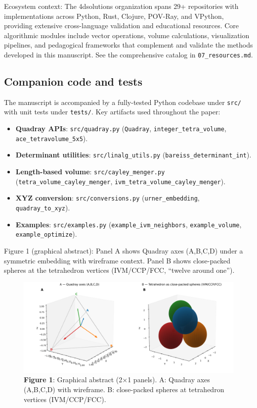 \documentclass[
  10pt,
]{article}
\providecommand{\tightlist}{%
  \setlength{\itemsep}{0pt}\setlength{\parskip}{0pt}}
\begin{document}
Ecosystem context: The 4dsolutions organization spans 29+ repositories
with implementations across Python, Rust, Clojure, POV-Ray, and VPython,
providing extensive cross-language validation and educational resources.
Core algorithmic modules include vector operations, volume calculations,
visualization pipelines, and pedagogical frameworks that complement and
validate the methods developed in this manuscript. See the comprehensive
catalog in \texttt{07\_resources.md}.

\hypertarget{companion-code-and-tests}{%
\subsection{Companion code and tests}\label{companion-code-and-tests}}

The manuscript is accompanied by a fully-tested Python codebase under
\texttt{src/} with unit tests under \texttt{tests/}. Key artifacts used
throughout the paper:

\begin{itemize}
\tightlist
\item
  \textbf{Quadray APIs}: \texttt{src/quadray.py} (\texttt{Quadray},
  \texttt{integer\_tetra\_volume}, \texttt{ace\_tetravolume\_5x5}).
\item
  \textbf{Determinant utilities}: \texttt{src/linalg\_utils.py}
  (\texttt{bareiss\_determinant\_int}).
\item
  \textbf{Length-based volume}: \texttt{src/cayley\_menger.py}
  (\texttt{tetra\_volume\_cayley\_menger},
  \texttt{ivm\_tetra\_volume\_cayley\_menger}).
\item
  \textbf{XYZ conversion}: \texttt{src/conversions.py}
  (\texttt{urner\_embedding}, \texttt{quadray\_to\_xyz}).
\item
  \textbf{Examples}: \texttt{src/examples.py}
  (\texttt{example\_ivm\_neighbors}, \texttt{example\_volume},
  \texttt{example\_optimize}).
\end{itemize}

Figure 1 (graphical abstract): Panel A shows Quadray axes (A,B,C,D)
under a symmetric embedding with wireframe context. Panel B shows
close-packed spheres at the tetrahedron vertices (IVM/CCP/FCC, ``twelve
around one'').

\begin{figure}
\centering
\includegraphics{figures/graphical_abstract_quadray.png}
\caption{\textbf{Figure 1}: Graphical abstract (2×1 panels). A: Quadray
axes (A,B,C,D) with wireframe. B: close-packed spheres at tetrahedron
vertices (IVM/CCP/FCC).}
\end{figure}
\end{document}
